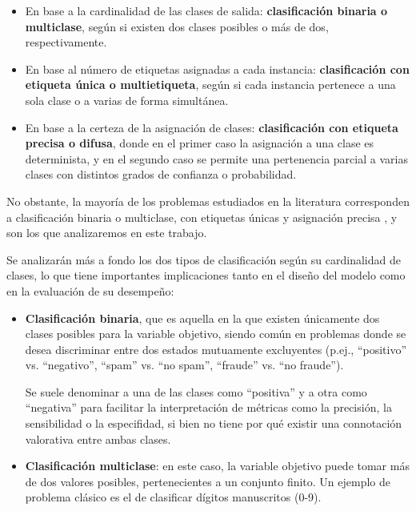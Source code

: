 \begin{itemize}
    \item En base a la cardinalidad de las clases de salida: \textbf{clasificación binaria o multiclase}, según 
    si existen dos clases posibles o más de dos, respectivamente.

    \item En base al número de etiquetas asignadas a cada instancia: \textbf{clasificación con etiqueta única o 
    multietiqueta}, según si cada instancia pertenece a una sola clase o a varias de forma simultánea.

    \item En base a la certeza de la asignación de clases: \textbf{clasificación con etiqueta precisa o difusa}, 
    donde en el primer caso la asignación a una clase es determinista, y en el segundo caso se permite una 
    pertenencia parcial a varias clases con distintos grados de confianza o probabilidad.
    
\end{itemize}

No obstante, la mayoría de los problemas estudiados en la literatura corresponden a clasificación binaria o 
multiclase, con etiquetas únicas y asignación precisa \cite{bishop2006}, y son los que analizaremos en este
trabajo.

Se analizarán más a fondo los dos tipos de clasificación según su cardinalidad de clases, lo que tiene 
importantes implicaciones tanto en el diseño del modelo como en la evaluación de su desempeño: 

\begin{itemize}

    \item \textbf{Clasificación binaria}, que es aquella en la que existen únicamente dos clases posibles para la 
    variable objetivo, siendo común en problemas donde se desea discriminar entre dos estados mutuamente 
    excluyentes (p.ej., ``positivo'' vs. ``negativo'', ``spam'' vs. ``no spam'', ``fraude'' vs. ``no fraude'').
    
    Se suele denominar a una de las clases como ``positiva'' y a otra como ``negativa'' para facilitar la 
    interpretación de métricas como la precisión, la sensibilidad o la especifidad, si bien no tiene por qué 
    existir una connotación valorativa entre ambas clases.
    
    \item \textbf{Clasificación multiclase}: en este caso, la variable objetivo puede tomar más de dos valores 
    posibles, pertenecientes a un conjunto finito. Un ejemplo de problema clásico es el de clasificar dígitos
    manuscritos (0-9).

\end{itemize}


